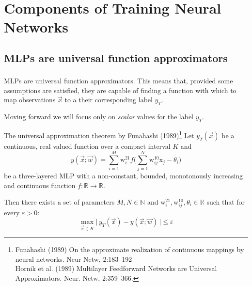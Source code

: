 \section{Components of Training Neural Networks}

\subsection{MLPs are universal function approximators}

\begin{frame}\frametitle{\subsecname}

MLPs are universal function approximators. This means that, provided some assumptions are satisfied, they are capable of finding a function with which to map observations $\vec x$ to a their corresponding label $y_T$.

Moving forward we will focus only on \emph{scalar} values for the label $y_T$.

   \begin{block}{The universal approximation theorem by Funahashi (1989)\footnote
	{ Funahashi (1989) On the approximate realization of 
		continuous mappings by neural networks. Neur Netw, 2:183--192\\
		Hornik et al. (1989) Multilayer Feedforward Networks 
		are Universal Approximators. Neur. Netw, 2:359--366. }}
	\small
    	Let $y_T{(\vec{x})}$ be a continuous, real valued function 
    	over a compact interval $K$ and     
		\begin{equation} 
		{y}{(\vec{x}; \vec w)} = \sum_{i=1}^M \mathrm{w}_i^{21} 
		f\Big( \sum\limits_{j=1}^N \mathrm{w}_{ij}^{10} 
		  \mathrm{x}_j - \theta_i \Big)
		 \end{equation}
    	be a three-layered MLP with a non-constant, bounded, 
    	monotonously increasing and continuous function 
    	$f: \mathbb{R} \rightarrow \mathbb{R}$.\\
		\vspace{4mm}
	   \pause

		Then there exists a set of parameters 
		$M, N \in \mathbb{N}$ and $\mathrm{w}_i^{21}, 
		\mathrm{w}_{ij}^{10}, \theta_i \in \mathbb{R}$ 
		such that for every $\varepsilon > 0$:
		\begin{equation}
		\max_{\vec{x} \in K} \Big| \, y_T{(\vec{x})} - {y}{(\vec{x}; \vec w)} \,\Big| 
		\leq \varepsilon
		 \end{equation}
  \end{block}
  
\end{frame}

